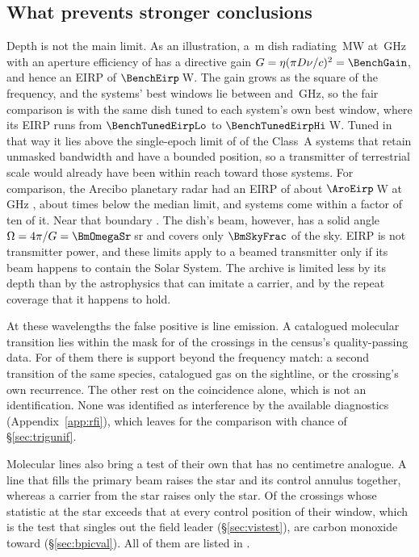 \subsection{What prevents stronger conclusions}
\label{sec:mmdifferent}

Depth is not the main limit. As an illustration, a \BenchDiam\,m dish
radiating \BenchPowerMW\,MW at \BenchFreqGHz\,GHz with an aperture efficiency
of \BenchEta{} has a directive gain $G=\eta(\pi D\nu/c)^{2}=\BenchGain$, and
hence an EIRP of $\BenchEirp$\,W. The gain grows as the square of the
frequency, and the systems' best windows lie between \BenchTunedFreqLo{} and
\BenchTunedFreqHi\,GHz, so the fair comparison is with the same dish tuned to
each system's own best window, where its EIRP runs from
$\BenchTunedEirpLo$ to $\BenchTunedEirpHi$\,W. Tuned in that way it lies
above the single-epoch limit of \BenchNSysTuned{} of the \NSysALimSum{}
Class~A systems that retain unmasked bandwidth and have a bounded position,
so a transmitter of terrestrial scale would already have been within reach
toward those systems. For comparison, the Arecibo planetary radar had an EIRP
of about $\AroEirp$\,W at \AroFreqGHz\,GHz \citep{EarthDetectingEarth2025},
about \AroMedMult{} times below the median limit, and \AroNSysTen{}
systems come within a factor of ten of it. Near that boundary
\AroTenEdgeClause. The dish's beam, however, has a solid
angle $\Omega=4\pi/G=\BmOmegaSr$\,sr and covers only $\BmSkyFrac$ of the sky.
EIRP is not transmitter power, and these limits apply to a beamed
transmitter only if its beam happens to contain the Solar System. The
archive is limited less by its depth than by the astrophysics that can
imitate a carrier, and by the repeat coverage that it happens to hold.

At these wavelengths the false positive is line emission. A
catalogued molecular transition lies within the mask for \CsNAttrQp{} of the
\CsNCrossQp{} crossings in the census's quality-passing data. For
\LnAttrSupp{} of them there is support beyond the frequency match: a second
transition of the same species, catalogued gas on the sightline, or the
crossing's own recurrence. The other \LnAttrCoincWord{} rest on the
coincidence alone, which is not an identification. None was identified as
interference by the available diagnostics (Appendix~\ref{app:rfi}), which
leaves \CsNUnattrQp{} for the comparison with chance of \S\ref{sec:trigunif}.

Molecular lines also bring a test of their own that has no centimetre
analogue. A line that fills the primary beam raises the star and its control
annulus together, whereas a carrier from the star raises only the star. Of the \LrStageN{}
crossings whose statistic at the star exceeds that at every control position
of their window, which is the test that singles out the field leader
(\S\ref{sec:vistest}), \LrStageNCo{} are carbon monoxide toward
\LrStageCoStars{} (\S\ref{sec:bpicval}). All of them are listed in
\texttt{\LrStageFile}.

